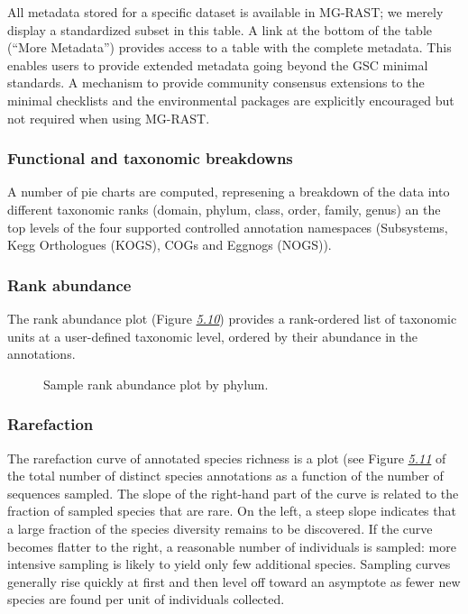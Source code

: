 \documentclass[letterpaper,10pt,english]{sphinxmanual}
\begin{document}
All metadata stored for a specific dataset is available in MG-RAST; we
merely display a standardized subset in this table. A link at the bottom
of the table (“More Metadata”) provides access to a table with the
complete metadata. This enables users to provide extended metadata going
beyond the GSC minimal standards. A mechanism to provide community
consensus extensions to the minimal checklists and the environmental
packages are explicitly encouraged but not required when using MG-RAST.


\subsubsection{Functional and taxonomic breakdowns}
\label{\detokenize{user_manual:functional-and-taxonomic-breakdowns}}
A number of pie charts are computed, represening a breakdown of the data
into different taxonomic ranks (domain, phylum, class, order, family,
genus) an the top levels of the four supported controlled annotation
namespaces (Subsystems, Kegg Orthologues (KOGS), COGs and Eggnogs
(NOGS)).


\subsubsection{Rank abundance}
\label{\detokenize{user_manual:rank-abundance}}
The rank abundance plot (Figure {\hyperref[\detokenize{user_manual:fig:rank-abundance}]{\emph{5.10}}}) provides
a rank-ordered list of taxonomic units at a user-defined taxonomic
level, ordered by their abundance in the annotations.

\begin{figure}[htbp]
\centering
\capstart

\noindent{}
\caption{Sample rank abundance plot by phylum.}\label{\detokenize{user_manual:fig-rank-abundance}}\end{figure}


\subsubsection{Rarefaction}
\label{\detokenize{user_manual:rarefaction}}
The rarefaction curve of annotated species richness is a plot (see
Figure {\hyperref[\detokenize{user_manual:fig:rarefaction}]{\emph{5.11}}} of the total number of distinct
species annotations as a function of the number of sequences sampled.
The slope of the right-hand part of the curve is related to the fraction
of sampled species that are rare. On the left, a steep slope indicates
that a large fraction of the species diversity remains to be discovered.
If the curve becomes flatter to the right, a reasonable number of
individuals is sampled: more intensive sampling is likely to yield only
few additional species. Sampling curves generally rise quickly at first
and then level off toward an asymptote as fewer new species are found
per unit of individuals collected.
\end{document}
